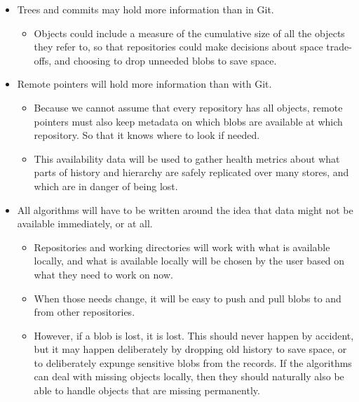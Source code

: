\documentclass[a4paper]{article}
\begin{document}
\begin{itemize}
\item
  Trees and commits may hold more information than in Git.

  \begin{itemize}
  \item
    Objects could include a measure of the cumulative size of all the objects
    they refer to, so that repositories could make decisions about space
    trade-offs, and choosing to drop unneeded blobs to save space.
  \end{itemize}

\item
  Remote pointers will hold more information than with Git.

  \begin{itemize}
  \item
    Because we cannot assume that every repository has all objects,
    remote pointers must also keep metadata on which blobs are available
    at which repository. So that it knows where to look if needed.
  \item
    This availability data will be used to gather health metrics about
    what parts of history and hierarchy are safely replicated over many
    stores, and which are in danger of being lost.
  \end{itemize}
\item
  All algorithms will have to be written around the idea that data might
  not be available immediately, or at all.

  \begin{itemize}
  \item
    Repositories and working directories will work with what is
    available locally, and what is available locally will be chosen by
    the user based on what they need to work on now.
  \item
    When those needs change, it will be easy to push and pull blobs to
    and from other repositories.
  \item
    However, if a blob is lost, it is lost. This should never happen by
    accident, but it may happen deliberately by dropping old history to
    save space, or to deliberately expunge sensitive blobs from the
    records. If the algorithms can deal with missing objects locally,
    then they should naturally also be able to handle objects that are
    missing permanently.
  \end{itemize}
\end{itemize}
\end{document}
